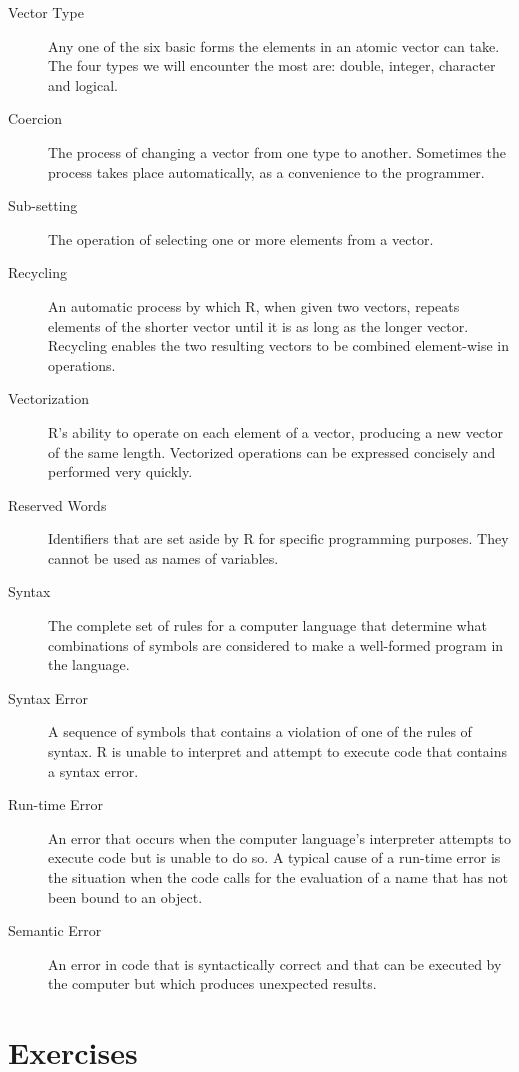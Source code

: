 \documentclass[]{book}
\theoremstyle{definition}
\theoremstyle{definition}
\theoremstyle{definition}
\theoremstyle{remark}
\begin{document}
{\begin{description}
\item[Vector Type]
Any one of the six basic forms the elements in an atomic vector can
take. The four types we will encounter the most are: double, integer,
character and logical.
\item[Coercion]
The process of changing a vector from one type to another. Sometimes the
process takes place automatically, as a convenience to the programmer.
\item[Sub-setting]
The operation of selecting one or more elements from a vector.
\item[Recycling]
An automatic process by which R, when given two vectors, repeats
elements of the shorter vector until it is as long as the longer vector.
Recycling enables the two resulting vectors to be combined element-wise
in operations.
\item[Vectorization]
R's ability to operate on each element of a vector, producing a new
vector of the same length. Vectorized operations can be expressed
concisely and performed very quickly.
\item[Reserved Words]
Identifiers that are set aside by R for specific programming purposes.
They cannot be used as names of variables.
\item[Syntax]
The complete set of rules for a computer language that determine what
combinations of symbols are considered to make a well-formed program in
the language.
\item[Syntax Error]
A sequence of symbols that contains a violation of one of the rules of
syntax. R is unable to interpret and attempt to execute code that
contains a syntax error.
\item[Run-time Error]
An error that occurs when the computer language's interpreter attempts
to execute code but is unable to do so. A typical cause of a run-time
error is the situation when the code calls for the evaluation of a name
that has not been bound to an object.
\item[Semantic Error]
An error in code that is syntactically correct and that can be executed
by the computer but which produces unexpected results.
\end{description}

\newpage

\section*{Exercises}\label{exercises}

}
\end{document}
